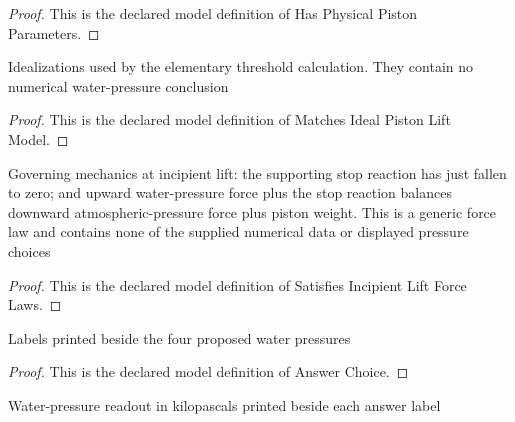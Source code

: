 \begin{proof}
  This is the declared model definition of Has Physical Piston Parameters.
\end{proof}
\begin{definition}
  \label{def:physics:phyx-mini-0662:phyxminiproblems-problemphyxmini0662-matchesidealpistonliftmodel}
  Idealizations used by the elementary threshold calculation. They contain no numerical water-pressure conclusion
\end{definition}
\begin{proof}
  This is the declared model definition of Matches Ideal Piston Lift Model.
\end{proof}
\begin{definition}
  \label{def:physics:phyx-mini-0662:phyxminiproblems-problemphyxmini0662-satisfiesincipientliftforcelaws}
  Governing mechanics at incipient lift: the supporting stop reaction has just fallen to zero; and upward water-pressure force plus the stop reaction balances downward atmospheric-pressure force plus piston weight. This is a generic force law and contains none of the supplied numerical data or displayed pressure choices
\end{definition}
\begin{proof}
  This is the declared model definition of Satisfies Incipient Lift Force Laws.
\end{proof}
\begin{definition}
  \label{def:physics:phyx-mini-0662:phyxminiproblems-problemphyxmini0662-answerchoice}
  Labels printed beside the four proposed water pressures
\end{definition}
\begin{proof}
  This is the declared model definition of Answer Choice.
\end{proof}
\begin{definition}
  \label{def:physics:phyx-mini-0662:phyxminiproblems-problemphyxmini0662-displayedpressureinkilopascals}
  Water-pressure readout in kilopascals printed beside each answer label
\end{definition}
